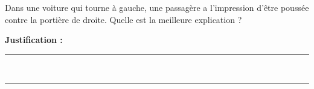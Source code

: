 Dans une voiture qui tourne à gauche, une passagère a l'impression d'être poussée contre la portière de droite. Quelle est la meilleure explication ?

\choices

\noindent\textbf{Justification :} \hrulefill \\[2.5ex]
\rule{\linewidth}{0.4pt} \\[2.5ex]
\rule{\linewidth}{0.4pt}
\vfill
